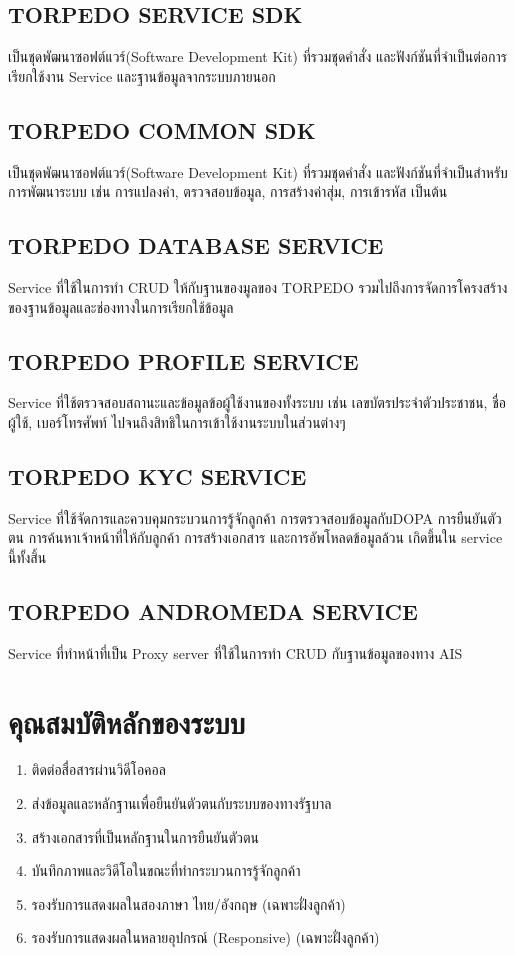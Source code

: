 \subsection{TORPEDO SERVICE SDK}
เป็นชุดพัฒนาซอฟต์แวร์(Software Development Kit) ที่รวมชุดคำสั่ง และฟังก์ชันที่จำเป็นต่อการเรียกใช้งาน Service และฐานข้อมูลจากระบบภายนอก
\subsection{TORPEDO COMMON SDK}
เป็นชุดพัฒนาซอฟต์แวร์(Software Development Kit) ที่รวมชุดคำสั่ง และฟังก์ชันที่จำเป็นสำหรับการพัฒนาระบบ เช่น การแปลงค่า, ตรวจสอบข้อมูล, การสร้างค่าสุ่ม, การเข้ารหัส เป็นต้น
\subsection{TORPEDO DATABASE SERVICE}
Service ที่ใช้ในการทำ CRUD ให้กับฐานของมูลของ TORPEDO รวมไปถึงการจัดการโครงสร้างของฐานข้อมูลและช่องทางในการเรียกใช้ข้อมูล
\subsection{TORPEDO PROFILE SERVICE}
Service ที่ใช้ตรวจสอบสถานะและข้อมูลข้อผู้ใช้งานของทั้งระบบ เช่น เลขบัตรประจำตัวประชาชน, ชื่อผู้ใช้, เบอร์โทรศัพท์ ไปจนถึงสิทธิในการเข้าใช้งานระบบในส่วนต่างๆ
\subsection{TORPEDO KYC SERVICE}
Service ที่ใช้จัดการและควบคุมกระบวนการรู้จักลูกค้า การตรวจสอบข้อมูลกับDOPA การยืนยันตัวตน การค้นหาเจ้าหน้าที่ให้กับลูกค้า การสร้างเอกสาร และการอัพโหลดข้อมูลล้วน เกิดขึ้นใน service นี้ทั้งสิ้น
\subsection{TORPEDO ANDROMEDA SERVICE}
Service ที่ทำหน้าที่เป็น Proxy server ที่ใช้ในการทำ CRUD กับฐานข้อมูลของทาง AIS

\section{คุณสมบัติหลักของระบบ}
\begin{enumerate}
	\item ติดต่อสื่อสารผ่านวิดีโอคอล
	\item ส่งข้อมูลและหลักฐานเพื่อยืนยันตัวตนกับระบบของทางรัฐบาล
	\item สร้างเอกสารที่เป็นหลักฐานในการยืนยันตัวตน
	\item บันทึกภาพและวิดีโอในขณะที่ทำกระบวนการรู้จักลูกค้า
	\item รองรับการแสดงผลในสองภาษา ไทย/อังกฤษ (เฉพาะฝั่งลูกค้า)
	\item รองรับการแสดงผลในหลายอุปกรณ์ (Responsive) (เฉพาะฝั่งลูกค้า)
\end{enumerate}

